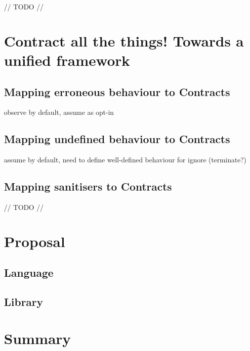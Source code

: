 // TODO // 

\section{Contract all the things! Towards a unified framework}

\subsection{Mapping erroneous behaviour to Contracts}

observe by default, assume as opt-in

\subsection{Mapping undefined behaviour to Contracts}

assume by default, need to define well-defined behaviour for ignore (terminate?)

\subsection{Mapping sanitisers to Contracts}

// TODO //

\section{Proposal}

\subsection{Language}

\subsection{Library}

\section{Summary}







\renewcommand{\bibname}{References}




